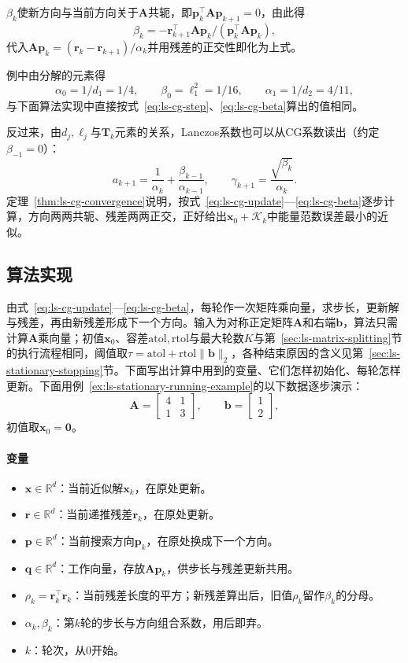 $\beta_k$使新方向与当前方向关于$\bm A$共轭，即$\bm p_k^\top\bm A\bm p_{k+1}=0$，由此得
\[
  \beta_k=-\bm r_{k+1}^\top\bm A\bm p_k/(\bm p_k^\top\bm A\bm p_k) ,
\]
代入$\bm A\bm p_k=(\bm r_k-\bm r_{k+1})/\alpha_k$并用残差的正交性即化为上式。

例中由分解的元素得
\[
 \alpha_0=1/d_1=1/4,\qquad \beta_0=\ell_1^2=1/16,\qquad \alpha_1=1/d_2=4/11 ,
\]
与下面算法实现中直接按式~\eqref{eq:ls-cg-step}、\eqref{eq:ls-cg-beta}算出的值相同。

反过来，由$d_j,\ell_j$与$\bm T_k$元素的关系，Lanczos系数也可以从CG系数读出（约定$\beta_{-1}=0$）：
\begin{equation}
 a_{k+1}=\frac1{\alpha_k}+\frac{\beta_{k-1}}{\alpha_{k-1}},\qquad \gamma_{k+1}=\frac{\sqrt{\beta_k}}{\alpha_k}.
 \label{eq:ls-cg-lanczos-coefficients}
\end{equation}
定理~\ref{thm:ls-cg-convergence}说明，按式~\eqref{eq:ls-cg-update}—\eqref{eq:ls-cg-beta}逐步计算，方向两两共轭、残差两两正交，正好给出$\bm x_0+\mathcal K_k$中能量范数误差最小的近似。

\subsection{算法实现}

由式~\eqref{eq:ls-cg-update}—\eqref{eq:ls-cg-beta}，每轮作一次矩阵乘向量，求步长，更新解与残差，再由新残差形成下一个方向。输入为对称正定矩阵$\bm A$和右端$\bm b$，算法只需计算$\bm A$乘向量；初值$\bm x_0$、容差$\mathrm{atol},\mathrm{rtol}$与最大轮数$K$与第~\ref{sec:ls-matrix-splitting}节的执行流程相同，阈值取$\tau=\mathrm{atol}+\mathrm{rtol}\lVert\bm b\rVert_2$，各种结束原因的含义见第~\ref{sec:ls-stationary-stopping}节。下面写出计算中用到的变量、它们怎样初始化、每轮怎样更新。下面用例~\ref{ex:ls-stationary-running-example}的以下数据逐步演示：
\[
 \bm A=\begin{bmatrix}4&1\\1&3\end{bmatrix},\qquad \bm b=\begin{bmatrix}1\\2\end{bmatrix},
\]
初值取$\bm x_0=\bm 0$。

\paragraph{变量}
\begin{itemize}
 \item $\bm x\in\mathbb R^d$：当前近似解$\bm x_k$，在原处更新。
 \item $\bm r\in\mathbb R^d$：当前递推残差$\bm r_k$，在原处更新。
 \item $\bm p\in\mathbb R^d$：当前搜索方向$\bm p_k$，在原处换成下一个方向。
 \item $\bm q\in\mathbb R^d$：工作向量，存放$\bm A\bm p_k$，供步长与残差更新共用。
 \item $\rho_k=\bm r_k^\top\bm r_k$：当前残差长度的平方；新残差算出后，旧值$\rho_k$留作$\beta_k$的分母。
 \item $\alpha_k,\beta_k$：第$k$轮的步长与方向组合系数，用后即弃。
 \item $k$：轮次，从$0$开始。
\end{itemize}

